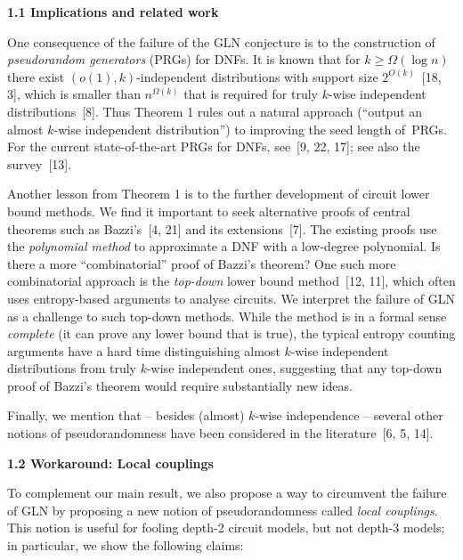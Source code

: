\par\medskip\noindent\textbf{
1.1 Implications and related work}\par




One consequence of the failure of the GLN conjecture is to the construction of \emph{pseudorandom generators} (PRGs) for DNFs. It is known that for $k\geq\Omega(\log n)$ there exist $(o(1),k)$-independent distributions with support size $2^{O(k)}$ [18, 3], which is smaller than $n^{\Omega(k)}$ that is required for truly $k$-wise independent distributions [8]. Thus Theorem 1 rules out a natural approach (“output an almost $k$-wise independent distribution”) to improving the seed length of PRGs. For the current state-of-the-art PRGs for DNFs, see [9, 22, 17]; see also the survey [13].\par




Another lesson from Theorem 1 is to the further development of circuit lower bound methods. We find it important to seek alternative proofs of central theorems such as Bazzi’s [4, 21] and its extensions [7]. The existing proofs use the \emph{polynomial method} to approximate a DNF with a low-degree polynomial. Is there a more “combinatorial” proof of Bazzi’s theorem? One such more combinatorial approach is the \emph{top-down} lower bound method [12, 11], which often uses entropy-based arguments to analyse circuits. We interpret the failure of GLN as a challenge to such top-down methods. While the method is in a formal sense \emph{complete} (it can prove any lower bound that is true), the typical entropy counting arguments have a hard time distinguishing almost $k$-wise independent distributions from truly $k$-wise independent ones, suggesting that any top-down proof of Bazzi’s theorem would require substantially new ideas.\par




Finally, we mention that – besides (almost) $k$-wise independence – several other notions of pseudorandomness have been considered in the literature [6, 5, 14].\par





\par\medskip\noindent\textbf{
1.2 Workaround: Local couplings}\par




To complement our main result, we also propose a way to circumvent the failure of GLN by proposing a new notion of pseudorandomness called \emph{local couplings}. This notion is useful for fooling depth-2 circuit models, but not depth-3 models; in particular, we show the following claims:\par


